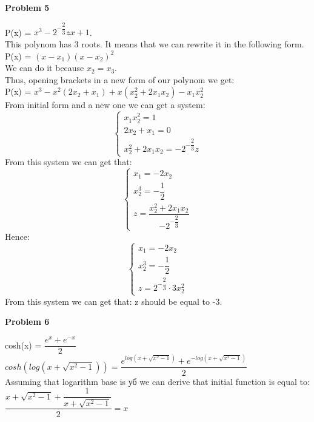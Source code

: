 \documentclass[12pt]{article}
\begin{document}
    \textbf{Problem 5}
    
    P(x) = $x^3 - 2^{-\dfrac{2}{3}}zx + 1$.\\
    This polynom has 3 roots. It means that we can rewrite it in the following form.\\
    P(x) = $(x - x_1)(x - x_2)^2$\\
    We can do it because $x_2 = x_3$.\\
    Thus, opening brackets in a new form of our polynom we get:\\ 
    P(x) = $x^3 - x^2(2x_2 + x_1) + x(x_2^2 + 2x_1x_2) - x_1x_2^2$\\
    From initial form and a new one we can get a system:\\
    \begin{equation*}
	    \begin{cases}
		    x_1x_2^2 = 1\\
		    2x_2+x_1 = 0\\
		    x_2^2+2x_1x_2 = -2^{-\dfrac{2}{3}}z
	    \end{cases}
    \end{equation*}
    From this system we can get that:\\
    \begin{equation*}
	    \begin{cases}
		    x_1 = - 2x_2\\
		    x_2^3 =-\dfrac{1}{2}\\
		    z = \dfrac{x_2^2+2x_1x_2}{-2^{-\dfrac{2}{3}}}
	    \end{cases}
    \end{equation*}
    Hence:
    \begin{equation*}
	    \begin{cases}
		    x_1 = - 2x_2\\
		    x_2^3 =-\dfrac{1}{2}\\
		    z = 2^{-\dfrac{2}{3}} \cdot 3x_2^2 
	    \end{cases}
    \end{equation*}
    From this system we can get that: z should be equal to -3.
    
    \textbf{Problem 6}
    
    cosh(x) = $\dfrac{e^x + e^{-x}}{2}$\\
    $cosh(log(x + \sqrt{x^2 - 1})) = \dfrac{e^{log(x + \sqrt{x^2 - 1})} + e^{-log(x + \sqrt{x^2 - 1})}}{2}$\\
    Assuming that logarithm base is уб we can derive that initial function is equal to:
    $\dfrac{x + \sqrt{x^2 - 1} + \dfrac{1}{x + \sqrt{x^2 - 1}}}{2}=x$
    
\end{document}
